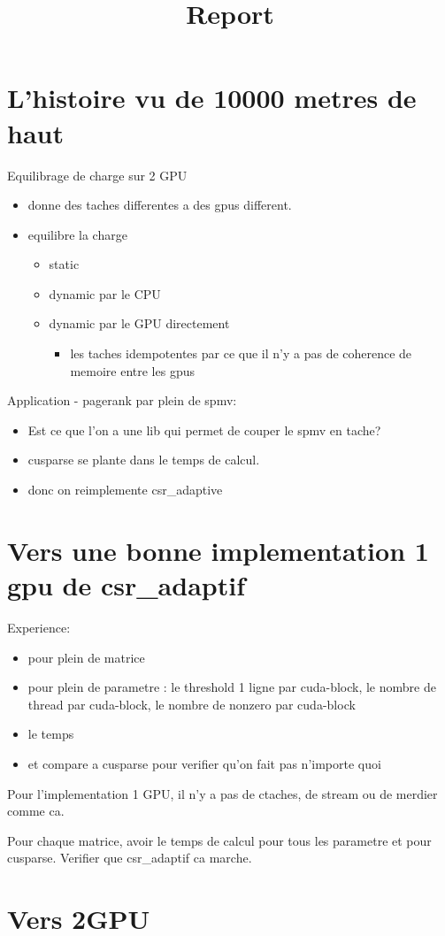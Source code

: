 \documentclass{article}
\title{Report}
\begin{document}
\maketitle

\section{L'histoire vu de 10000 metres de haut}

Equilibrage de charge sur 2 GPU
\begin{itemize}
\item donne des taches differentes a des gpus different.
\item equilibre la charge
  \begin{itemize}
  \item static
  \item dynamic par le CPU
  \item dynamic par le GPU directement
    \begin{itemize}
    \item les taches idempotentes par ce que il n'y a pas de coherence
      de memoire entre les gpus
    \end{itemize}
  \end{itemize}
\end{itemize}

Application - pagerank par plein de spmv:
\begin{itemize}
\item Est ce que l'on a une lib qui permet de couper le spmv en tache?
\item cusparse se plante dans le temps de calcul.
\item donc on reimplemente csr\_adaptive
\end{itemize}

\section{Vers une bonne implementation 1 gpu de csr\_adaptif}

Experience:
\begin{itemize}
\item pour plein de matrice
\item pour plein de parametre : le threshold 1 ligne par cuda-block, le nombre de thread par cuda-block, le nombre de nonzero par cuda-block
\item le temps
\item et compare a cusparse pour verifier qu'on fait pas n'importe quoi
\end{itemize}

Pour l'implementation 1 GPU, il n'y a pas de ctaches, de stream ou de
merdier comme ca.

Pour chaque matrice, avoir le temps de calcul pour tous les parametre
et pour cusparse. Verifier que csr\_adaptif ca marche. 

\section{Vers 2GPU}
\end{document}
